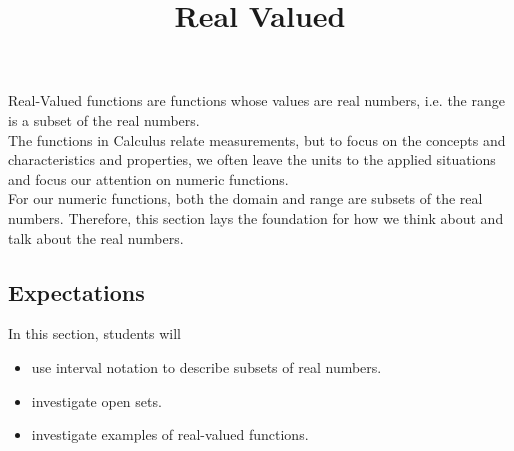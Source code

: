 \documentclass{ximera}
\title{Real Valued}
\begin{document}
\begin{abstract}
\end{abstract}
\maketitle





Real-Valued functions are functions whose values are real numbers, i.e. the range is a subset of the real numbers. \\


The functions in Calculus relate measurements, but to focus on the concepts and characteristics and properties, we often leave the units to the applied situations and focus our attention on numeric functions. \\


For our numeric functions, both the domain and range are subsets of the real numbers. Therefore, this section lays the foundation for how we think about and talk about the real numbers.










\subsection{Expectations}





\begin{sectionOutcomes}
In this section, students will 

\begin{itemize}
\item use interval notation to describe subsets of real numbers.
\item investigate open sets.
\item investigate examples of real-valued functions.
\end{itemize}
\end{sectionOutcomes}
\end{document}
